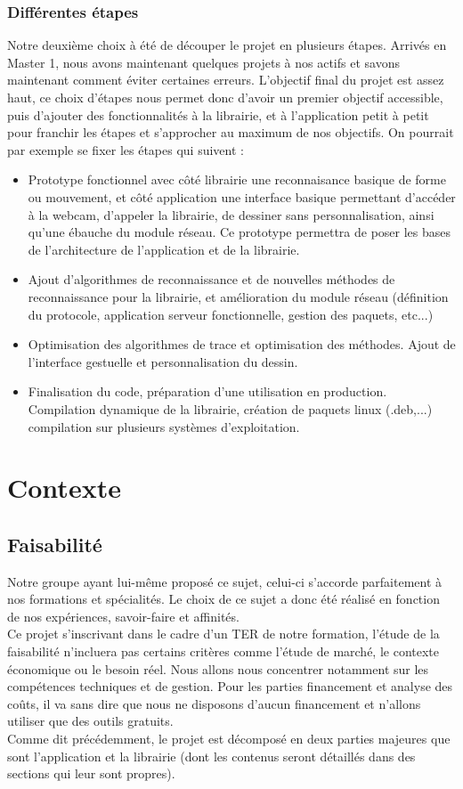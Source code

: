 \documentclass{article}
\begin{document}
				\subsubsection{Différentes étapes}
				Notre deuxième choix à été de découper le projet en plusieurs étapes. Arrivés en Master 1, nous avons maintenant quelques projets à nos actifs et savons maintenant comment éviter certaines erreurs. L'objectif final du projet est assez haut, ce choix d'étapes nous permet donc d'avoir un premier objectif accessible, puis d'ajouter des fonctionnalités à la librairie, et à l'application petit à petit pour franchir les étapes et s'approcher au maximum de nos objectifs. On pourrait par exemple se fixer les étapes qui suivent : \\
				\begin{itemize}
					\item{Prototype fonctionnel avec côté librairie une reconnaisance basique de forme ou mouvement, et côté application une interface basique permettant d'accéder à la webcam, d'appeler la librairie, de dessiner sans personnalisation, ainsi qu'une ébauche du module réseau. Ce prototype permettra de poser les bases de l'architecture de l'application et de la librairie.}
					\item{Ajout d'algorithmes de reconnaissance et de nouvelles méthodes de reconnaissance pour la librairie, et amélioration du module réseau (définition du protocole, application serveur fonctionnelle, gestion des paquets, etc...)}
					\item{Optimisation des algorithmes de trace et optimisation des méthodes. Ajout de l'interface gestuelle et personnalisation du dessin.}
					\item{Finalisation du code, préparation d'une utilisation en production. Compilation dynamique de la librairie, création de paquets linux (.deb,...) compilation sur plusieurs systèmes d'exploitation.}
				\end{itemize}
	\section{Contexte}
		\subsection{Faisabilité}
		Notre groupe ayant lui-même proposé ce sujet, celui-ci s'accorde parfaitement à nos formations et spécialités. Le choix de ce sujet a donc été réalisé en fonction de nos expériences, savoir-faire et affinités.\\
Ce projet s'inscrivant dans le cadre d'un TER de notre formation, l'étude de la faisabilité n'incluera pas certains critères comme l'étude de marché, le contexte économique ou le besoin réel. Nous allons nous concentrer notamment sur les compétences techniques et de gestion. Pour les parties financement et analyse des coûts, il va sans dire que nous ne disposons d'aucun financement et n'allons utiliser que des outils gratuits. \\
Comme dit précédemment, le projet est décomposé en deux parties majeures que sont l'application et la librairie (dont les contenus seront détaillés dans des sections qui leur sont propres).
\end{document}
